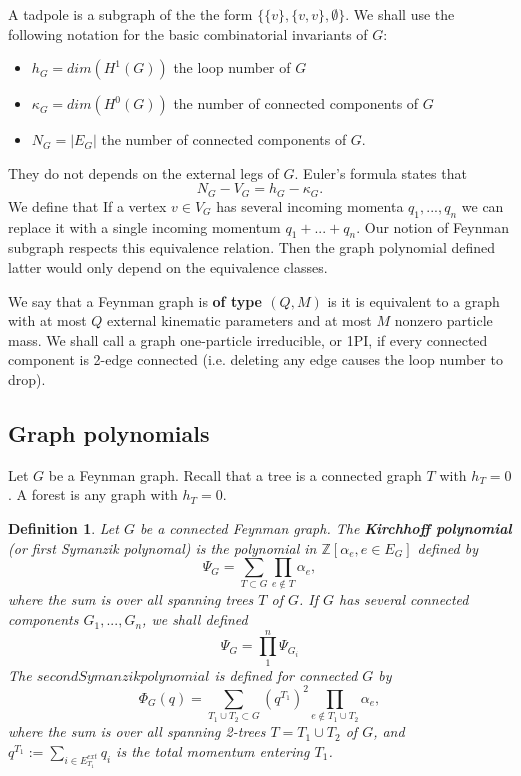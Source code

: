 \documentclass[11pt]{article}
\newtheorem{dfn}[thm]{Definition}
\newcommand{\intg}{\mathbb Z}
\begin{document}
A tadpole is a subgraph of the the form $\{\{v\},\{v,v\},\emptyset\}$. We shall use the following notation for the basic combinatorial invariants of $G$:
\begin{itemize}
\item $h_G=dim(H^1(G))$ the loop number of $G$
\item $\kappa_G=dim(H^0(G))$ the number of connected components of $G$
\item $N_G=|E_G|$ the number of connected components of $G$.
\end{itemize}
They do not depends on the external legs of $G$. Euler's formula states that
$$
N_G-V_G=h_G-\kappa_G.
$$
We define that If a vertex $v\in V_G$ has several incoming momenta $q_1,...,q_n$ we can replace it with a single incoming momentum $q_1 +...+ q_n$. Our notion of Feynman subgraph respects this equivalence relation. Then the graph polynomial defined latter would only depend on the equivalence classes.

We say that a Feynman graph is \textbf{of type $(Q,M)$} is it is equivalent to a graph with at most $Q$ external kinematic parameters and at most $M$ nonzero particle mass. We shall call a graph one-particle irreducible, or 1PI, if every connected component is 2-edge connected (i.e. deleting any edge causes the loop number to drop).
\subsection{Graph polynomials}
Let $G$ be a Feynman graph. Recall that a tree is a connected graph $T$ with $h_T=0$. A forest is any graph with $h_T=0$.
\begin{dfn}
Let $G$ be a connected Feynman graph. The \textbf{Kirchhoff polynomial} (or first Symanzik polynomal) is the polynomial in $\intg[\alpha_e,e\in E_G]$ defined by
\begin{equation}\label{eq:pol_Psi}
\Psi_G=\sum_{T\subset G}\prod_{e\not \in T}\alpha_e,
\end{equation}
where the sum is over all spanning trees $T$ of $G$. If $G$ has several connected components $G_1,...,G_n$, we shall defined
$$
\Psi_G=\prod_{1}^n\Psi_{G_i}
$$
The $second Symanzik polynomial$ is defined for connected $G$ by
\begin{equation}\label{eq:pol_Phi}
\Phi_G(q)=\sum_{T_1\cup T_2\subset G}(q^{T_1})^2 \prod_{e\not \in T_1\cup T_2}\alpha_e,
\end{equation}
where the sum  is over all spanning 2-trees $T=T_1\cup T_2$ of $G$, and $q^{T_1}:=\sum_{i\in E^{ext}_{T_1}}q_i$ is the total momentum entering $T_1$.
\end{dfn}
\end{document}
